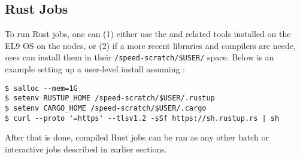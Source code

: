 \subsection{Rust Jobs}
\label{sect:rust}

To run Rust jobs, one can (1) either use the  and
related tools installed on the EL9 OS on the nodes, or (2) if
a more recent libraries and compilers are neede, uses
can install them in their \texttt{/speed-scratch/\$USER/}
space. Below is an example setting up a user-level
install assuming :

\scriptsize
\begin{verbatim}
$ salloc --mem=1G
$ setenv RUSTUP_HOME /speed-scratch/$USER/.rustup
$ setenv CARGO_HOME /speed-scratch/$USER/.cargo
$ curl --proto '=https' --tlsv1.2 -sSf https://sh.rustup.rs | sh
\end{verbatim}
\normalsize

After that is done, compiled Rust jobs can be ran as any other
batch or interactive jobs described in earlier sections.
